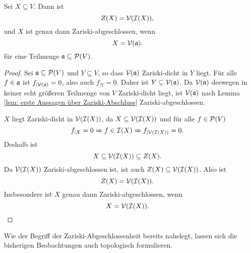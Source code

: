 \documentclass[a4paper,10pt]{article}
\begin{document}
\begin{lem}\label{lem: Charakterisierung durch Verschwindungsmengen}
 Sei $X \subseteq V$. Dann ist
 \[
  Z(X) = \mathcal{V}( \mathcal{I}(X) ),
 \]
 und  $X$ ist genau dann Zariski-abgeschlossen, wenn
 \[
  X = \mathcal{V}(\mathfrak{a}).
 \]
 für eine Teilmenge $\mathfrak{a} \subseteq \mathcal{P}(V)$.
\end{lem}
\begin{proof}
 Sei $\mathfrak{a} \subseteq \mathcal{P}(V)$ und $Y \subseteq V$, so dass $\mathcal{V}(\mathfrak{a})$ Zariski-dicht in $Y$ liegt. Für alle $f \in \mathfrak{a}$ ist $f_{|\mathcal{V}(\mathfrak{a})} = 0$, also auch $f_{|Y} = 0$. Daher ist $Y \subseteq \mathcal{V}(\mathfrak{a})$. Da $\mathcal{V}(\mathfrak{a})$ deswegen in keiner echt größeren Teilmenge von $V$ Zariski-dicht liegt, ist $\mathcal{V}(\mathfrak{a})$ nach Lemma \ref{lem: erste Aussagen über Zariski-Abschluss} Zariski-abgeschlossen.
 
 $X$ liegt Zariski-dicht in $\mathcal{V}(\mathcal{I}(X))$, da $X \subseteq \mathcal{V}(\mathcal{I}(X))$ und für alle $f \in \mathcal{P}(V)$
 \[
  f_{|X} = 0 \Rightarrow f \in \mathcal{I}(X) \Rightarrow f_{|\mathcal{V}(\mathcal{I}(X))} = 0.
 \]
 Deshalb ist
 \[
  X \subseteq \mathcal{V}(\mathcal{I}(X)) \subseteq Z(X).
 \]
 Da $\mathcal{V}(\mathcal{I}(X))$ Zariski-abgeschlossen ist, ist auch $Z(X) \subseteq \mathcal{V}(\mathcal{I}(X))$. Also ist
 \[
  Z(X) = \mathcal{V}(\mathcal{I}(X)).
 \]
 Insbesondere ist $X$ genau dann Zariski-abgeschlossen, wenn
 \[
  X = \mathcal{V}(\mathcal{I}(X)).
 \]
\end{proof}


Wie der Begriff der Zariski-Abgeschlossenheit bereits nahelegt, lassen sich die bisherigen Beobachtungen auch topologisch formulieren. 
\end{document}
